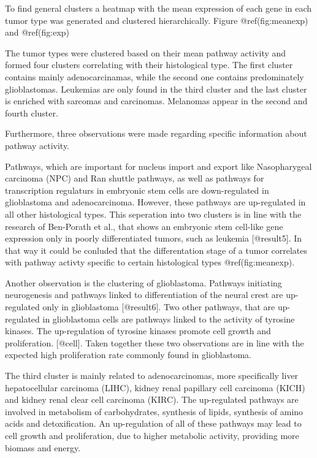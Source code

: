 \documentclass[
]{article}
\begin{document}
To find general clusters a heatmap with the mean expression of each gene
in each tumor type was generated and clustered hierarchically. Figure
@ref(fig:meanexp) and @ref(fig:exp)

The tumor types were clustered based on their mean pathway activity and
formed four clusters correlating with their histological type. The first
cluster contains mainly adenocarcinamas, while the second one contains
predominately glioblastomas. Leukemias are only found in the third
cluster and the last cluster is enriched with sarcomas and carcinomas.
Melanomas appear in the second and fourth cluster.

Furthermore, three observations were made regarding specific information
about pathway activity.

Pathways, which are important for nucleus import and export like
Nasopharygeal carcinoma (NPC) and Ran shuttle pathways, as well as
pathways for transcription regulaturs in embryonic stem cells are
down-regulated in glioblastoma and adenocarcinoma. However, these
pathways are up-regulated in all other histological types. This
seperation into two clusters is in line with the research of Ben-Porath
et al., that shows an embryonic stem cell-like gene expression only in
poorly differentiated tumors, such as leukemia {[}@result5{]}. In that
way it could be conluded that the differentation stage of a tumor
correlates with pathway activty specific to certain histological types
@ref(fig:meanexp).

Another observation is the clustering of glioblastoma. Pathways
initiating neurogenesis and pathways linked to differentiation of the
neural crest are up-regulated only in glioblastoma {[}@result6{]}. Two
other pathways, that are up-regulated in glioblastoma cells are pathways
linked to the activity of tyrosine kinases. The up-regulation of
tyrosine kinases promote cell growth and proliferation. {[}@cell{]}.
Taken together these two observations are in line with the expected high
proliferation rate commonly found in glioblastoma.

The third cluster is mainly related to adenocarcinomas, more
specifically liver hepatocellular carcinoma (LIHC), kidney renal
papillary cell carcinoma (KICH) and kidney renal clear cell carcinoma
(KIRC). The up-regulated pathways are involved in metabolism of
carbohydrates, synthesis of lipids, synthesis of amino acids and
detoxification. An up-regulation of all of these pathways may lead to
cell growth and proliferation, due to higher metabolic activity,
providing more biomass and energy.
\end{document}
